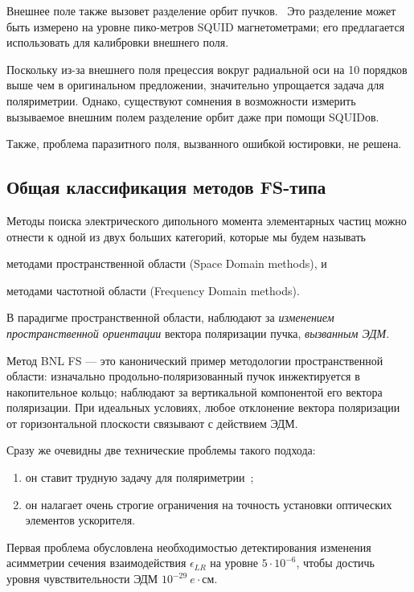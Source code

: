 Внешнее поле также вызовет разделение орбит
пучков.~\cite[стр.~1963]{Koop:SpinWheel} Это разделение может быть
измерено на уровне пико-метров SQUID магнетометрами; его предлагается
использовать для калибровки внешнего поля.

Поскольку из-за внешнего поля прецессия вокруг радиальной оси на 10
порядков выше чем в оригинальном предложении, значительно упрощается
задача для поляриметрии. Однако, существуют сомнения в возможности
измерить вызываемое внешним полем разделение орбит даже при помощи SQUIDов.

Также, проблема паразитного поля, вызванного ошибкой юстировки, не решена.

\subsection{Общая классификация методов FS-типа}
Методы поиска электрического дипольного момента элементарных частиц можно отнести к одной из 
двух больших категорий, которые мы будем называть 
\begin{enumerate*}
	\item методами пространственной области (Space Domain methods), и
	\item методами частотной области (Frequency Domain methods).
\end{enumerate*}

В парадигме пространственной области, наблюдают за \emph{изменением пространственной
ориентации} вектора поляризации пучка, \emph{вызванным ЭДМ}. 

Метод BNL FS --- это канонический пример методологии пространственной области: изначально
продольно-поляризованный пучок инжектируется в накопительное кольцо; наблюдают за 
вертикальной компонентой его вектора поляризации. При идеальных условиях, любое отклонение
вектора поляризации от горизонтальной плоскости связывают с действием ЭДМ.

Сразу же очевидны две технические проблемы такого подхода:
\begin{enumerate}
	\item он ставит трудную задачу для поляриметрии~\cite{Mane:SpinWheel};
	\item он налагает очень строгие ограничения на точность установки оптических элементов ускорителя.
\end{enumerate}

Первая проблема обусловлена необходимостью детектирования изменения асимметрии сечения 
взаимодействия $\epsilon_{LR}$ на уровне $5\cdot 10^{-6}$, чтобы достичь уровня чувствительности
ЭДМ $10^{-29}~e\cdot$см.~\cite[стр.~18]{BNL:Deuteron2008}

